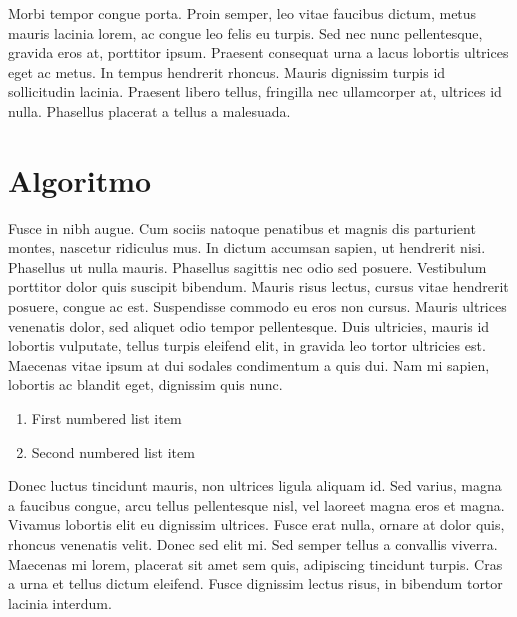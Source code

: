 \documentclass[11pt]{article} %
\begin{document}
Morbi tempor congue porta. Proin semper, leo vitae faucibus dictum, metus mauris lacinia lorem, ac congue leo felis eu turpis. Sed nec nunc pellentesque, gravida eros at, porttitor ipsum. Praesent consequat urna a lacus lobortis ultrices eget ac metus. In tempus hendrerit rhoncus. Mauris dignissim turpis id sollicitudin lacinia. Praesent libero tellus, fringilla nec ullamcorper at, ultrices id nulla. Phasellus placerat a tellus a malesuada.


\section*{Algoritmo}

Fusce in nibh augue. Cum sociis natoque penatibus et magnis dis parturient montes, nascetur ridiculus mus. In dictum accumsan sapien, ut hendrerit nisi. Phasellus ut nulla mauris. Phasellus sagittis nec odio sed posuere. Vestibulum porttitor dolor quis suscipit bibendum. Mauris risus lectus, cursus vitae hendrerit posuere, congue ac est. Suspendisse commodo eu eros non cursus. Mauris ultrices venenatis dolor, sed aliquet odio tempor pellentesque. Duis ultricies, mauris id lobortis vulputate, tellus turpis eleifend elit, in gravida leo tortor ultricies est. Maecenas vitae ipsum at dui sodales condimentum a quis dui. Nam mi sapien, lobortis ac blandit eget, dignissim quis nunc.

\begin{enumerate}
\item First numbered list item
\item Second numbered list item
\end{enumerate}

Donec luctus tincidunt mauris, non ultrices ligula aliquam id. Sed varius, magna a faucibus congue, arcu tellus pellentesque nisl, vel laoreet magna eros et magna. Vivamus lobortis elit eu dignissim ultrices. Fusce erat nulla, ornare at dolor quis, rhoncus venenatis velit. Donec sed elit mi. Sed semper tellus a convallis viverra. Maecenas mi lorem, placerat sit amet sem quis, adipiscing tincidunt turpis. Cras a urna et tellus dictum eleifend. Fusce dignissim lectus risus, in bibendum tortor lacinia interdum.






\end{document}
